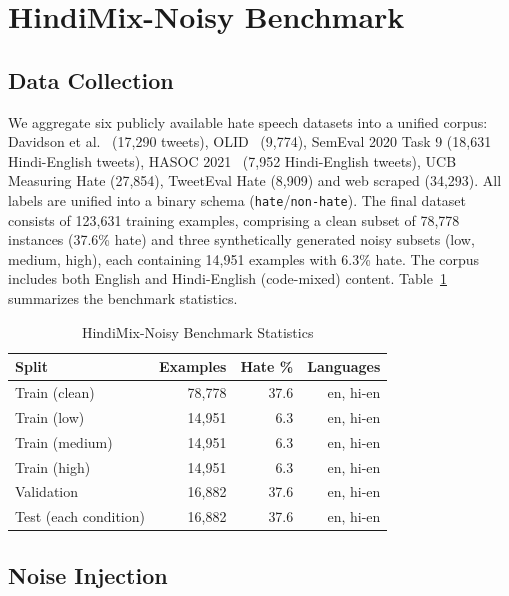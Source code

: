 \documentclass[conference]{IEEEtran}
\begin{document}
\section{HindiMix-Noisy Benchmark}
\label{sec:benchmark}

\subsection{Data Collection}

We aggregate six publicly available hate speech datasets into a unified corpus: Davidson et al.~\cite{davidson2017automated} (17,290 tweets), OLID~\cite{zampieri2019predicting} (9,774), SemEval 2020 Task 9 (18,631 Hindi-English tweets), HASOC 2021~\cite{mandl2021hasoc} (7,952 Hindi-English tweets), UCB Measuring Hate (27,854), TweetEval Hate (8,909) and web scraped (34,293). All labels are unified into a binary schema (\texttt{hate}/\texttt{non-hate}). The final dataset consists of 123,631 training examples, comprising a clean subset of 78,778 instances (37.6\% hate) and three synthetically generated noisy subsets (low, medium, high), each containing 14,951 examples with 6.3\% hate. The corpus includes both English and Hindi-English (code-mixed) content. Table~\ref{tab:benchmark} summarizes the benchmark statistics.

\begin{table}[H]
\caption{HindiMix-Noisy Benchmark Statistics}
\label{tab:benchmark}
\centering
\small
\begin{tabular}{lrrr}
\toprule
\textbf{Split} & \textbf{Examples} & \textbf{Hate \%} & \textbf{Languages} \\
\midrule
Train (clean)  & 78,778 & 37.6 & en, hi-en \\
Train (low)    & 14,951 &  6.3 & en, hi-en \\
Train (medium) & 14,951 &  6.3 & en, hi-en \\
Train (high)   & 14,951 &  6.3 & en, hi-en \\
\midrule
Validation     & 16,882 & 37.6 & en, hi-en \\
Test (each condition) & 16,882 & 37.6 & en, hi-en \\
\bottomrule
\end{tabular}
\end{table}

\subsection{Noise Injection}
\end{document}
